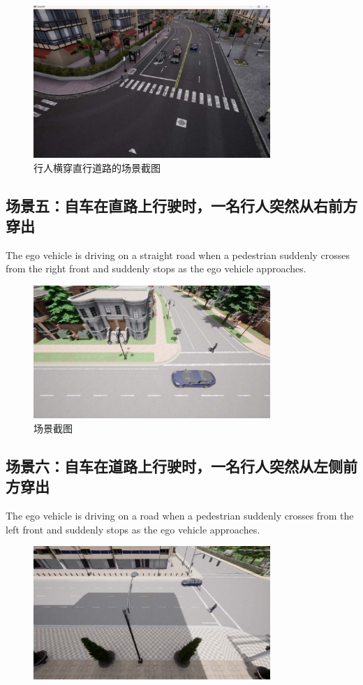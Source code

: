 \begin{figure}[H]
	\centering
	\includegraphics[width=0.8\textwidth]{"images/5.pdf"}
	\caption{行人横穿直行道路的场景截图}
	\label{fig:pedestrian_crossing}
\end{figure}
\subsection {场景五：自车在直路上行驶时，一名行人突然从右前方穿出}
\indent The ego vehicle is driving on a straight road when a pedestrian suddenly crosses from the right front and suddenly stops as the ego vehicle approaches.\\
\begin{figure}[H]
	\centering
	\includegraphics[width=0.8\textwidth]{"images/场景5.pdf"}
	\caption{场景截图}
	\label{}
\end{figure}
\subsection {场景六：自车在道路上行驶时，一名行人突然从左侧前方穿出}
\indent The ego vehicle is driving on a road when a pedestrian suddenly crosses from the left front and suddenly stops as the ego vehicle approaches.\\
\begin{figure}[H]
	\centering
	\includegraphics[width=0.8\textwidth]{"images/场景6.pdf"}
	\caption{}
	\label{}
\end{figure}
